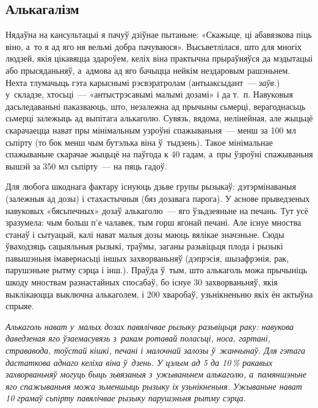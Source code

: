 \subsection*{Алькагалізм} 

Нядаўна на кансультацыі я пачуў дзіўнае пытаньне: «Скажыце, ці абавязкова піць віно, а~то я ад яго ня вельмі добра пачуваюся». Высьветлілася, што для многіх людзей, якія цікавяцца здароўем, келіх віна практычна прыраўняўся да мэдытацыі або прысяданьняў, а~адмова ад яго бачыцца нейкім нездаровым рашэньнем. Нехта тлумачыць гэта карыснымі рэсвэратролам (антыаксыдант~--- \emph{заўв.}) у~складзе, хтосьці~--- «антыстрэсавымі малымі дозамі» і да т.~п. Навуковыя дасьледаваньні паказваюць, што, незалежна ад прычыны сьмерці, верагоднасьць сьмерці залежыць ад выпітага алькаголю. Сувязь, вядома, нелінейная, але жыцьцё скарачаецца нават пры мінімальным узроўні спажываньня~--- менш за 100 мл сьпірту (то бок менш чым бутэлька віна ў~тыдзень). Такое мінімальнае спажываньне скарачае жыцьцё на паўгода к 40 гадам, а~пры ўзроўні спажываньня вышэй за 350 мл сьпірту~--- на пяць гадоў.


Для любога шкоднага фактару існуюць дзьве групы рызыкаў: дэтэрмінаваныя (залежныя ад дозы) і стахастычныя (бяз дозавага парога). У аснове прыведзеных навуковых «бясьпечных» дозаў алькаголю~--- яго ўзьдзеяньне на печань. Тут усё зразумела: чым больш п'е чалавек, тым горш ягонай печані. Але існуе мноства станаў і сытуацый, калі нават малыя дозы маюць вялікае значэньне. Сюды ўваходзяць сацыяльныя рызыкі, траўмы, заганы разьвіцьця плода і рызыкі павышэньня імавернасьці іншых захворваньняў (дэпрэсія, шызафрэнія, рак, парушэньне рытму сэрца і інш.). Праўда ў~тым, што алькаголь можа прычыніць шкоду мноствам разнастайных спосабаў, бо існуе 30 захворваньняў, якія выклікаюцца выключна алькаголем, і 200 хваробаў, узьнікненьню якіх ён актыўна спрыяе.

\emph{Алькаголь нават у~малых дозах павялічвае рызыку разьвіцьця раку: навукова даведзеная яго ўзаемасувязь з~ракам ротавай поласьці, носа, гартані, стрававода, тоўстай кішкі, печані і малочнай залозы ў~жанчынаў. Для гэтага дастаткова аднаго келіха віна ў~дзень. У цэлым ад 5 да 10\,\% ракавых захворваньняў могуць быць зьвязаныя з~ужываньнем алькаголю, а~памяншэньне яго спажываньня можа зьменшыць рызыку іх узьнікненьня. Ужываньне нават 10 грамаў сьпірту павялічвае рызыку парушэньня рытму сэрца.}

